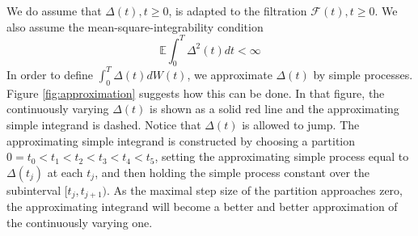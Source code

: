 \documentclass[\topdir/lecture\_notes.tex]{subfiles}
\begin{document}
We do assume that $\Delta(t), t \geq 0$, is adapted to the filtration $\mathcal{F}(t), t \geq 0$. We also assume the mean-square-integrability condition
\begin{equation}
\mathbb{E} \int_{0}^{T} \Delta^{2}(t) d t<\infty
\end{equation}
In order to define $\int_{0}^{T} \Delta(t) d W(t)$, we approximate $\Delta(t)$ by simple processes. Figure \ref{fig:approximation} suggests how this can be done. In that figure, the continuously varying $\Delta(t)$ is shown as a solid red line and the approximating simple integrand is dashed. Notice that $\Delta(t)$ is allowed to jump. The approximating simple integrand is constructed by choosing a partition $0=t_{0}<t_{1}<t_{2}<t_{3}<t_{4}<t_{5}$, setting the approximating simple process equal to $\Delta(t_{j})$ at each $t_{j}$, and then holding the simple process constant over the subinterval $[t_{j}, t_{j+1})$. As the maximal step size of the partition approaches zero, the approximating integrand will become a better and better approximation of the continuously varying one.
\end{document}
